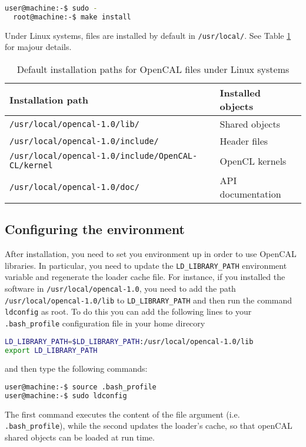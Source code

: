 \begin{lstlisting}[numbers=none,language=bash,label={ch:quickstart:install}]
  user@machine:-$ sudo -
  root@machine:-$ make install
\end{lstlisting}


\noindent Under Linux systems, files are installed by default in
\texttt{/usr/local/}. See Table \ref{ch:ddefault_paths} for majour
details.

\begin{table}[h]
  \centering
  \caption{Default installation paths for OpenCAL files under Linux systems}
  \label{ch:ddefault_paths}
  \begin{tabularx}{\textwidth}{ll}
    \hline
    \textbf{Installation path} & \textbf{Installed objects}\\
    \hline
    \verb'/usr/local/opencal-1.0/lib/'                   & Shared objects \\
    \verb'/usr/local/opencal-1.0/include/'                & Header files \\
    \verb'/usr/local/opencal-1.0/include/OpenCAL-CL/kernel' & OpenCL kernels \\
    \verb'/usr/local/opencal-1.0/doc/'                   & API documentation \\
    \hline
  \end{tabularx}
\end{table}


\subsection{Configuring the environment}
After installation, you need to set you environment up in order to use
OpenCAL libraries. In particular, you need to update the
\verb'LD_LIBRARY_PATH' environment variable and regenerate the loader
cache file. For instance, if you installed the software in
\verb'/usr/local/opencal-1.0', you need to add the path
\verb'/usr/local/opencal-1.0/lib' to \verb'LD_LIBRARY_PATH' and then
run the command \verb'ldconfig' as root. To do this you can add the
following lines to your \verb'.bash_profile' configuration file in
your home direcory
\begin{lstlisting}[numbers=none,language=bash,label={ch:quickstart:.bash_profile}]
LD_LIBRARY_PATH=$LD_LIBRARY_PATH:/usr/local/opencal-1.0/lib
export LD_LIBRARY_PATH
\end{lstlisting}
and then type the following commands:
\begin{lstlisting}[numbers=none,language=bash,label={ch:quickstart:source}]
user@machine:-$ source .bash_profile
user@machine:-$ sudo ldconfig
\end{lstlisting}
The first command executes the content of the file argument
(i.e. \verb'.bash_profile'), while the second updates the loader's
cache, so that openCAL shared objects can be loaded at run time.

